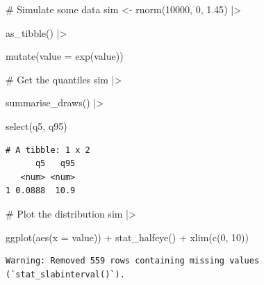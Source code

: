 \documentclass[
  letterpaper,
  DIV=11,
  numbers=noendperiod]{scrreprt}
\newenvironment{Shaded}{\begin{snugshade}}{\end{snugshade}}
\newcommand{\AttributeTok}[1]{\textcolor[rgb]{0.40,0.45,0.13}{#1}}
\newcommand{\CommentTok}[1]{\textcolor[rgb]{0.37,0.37,0.37}{#1}}
\newcommand{\DecValTok}[1]{\textcolor[rgb]{0.68,0.00,0.00}{#1}}
\newcommand{\FloatTok}[1]{\textcolor[rgb]{0.68,0.00,0.00}{#1}}
\newcommand{\FunctionTok}[1]{\textcolor[rgb]{0.28,0.35,0.67}{#1}}
\newcommand{\NormalTok}[1]{\textcolor[rgb]{0.00,0.23,0.31}{#1}}
\newcommand{\OtherTok}[1]{\textcolor[rgb]{0.00,0.23,0.31}{#1}}
\newcommand{\SpecialCharTok}[1]{\textcolor[rgb]{0.37,0.37,0.37}{#1}}
\begin{document}
\begin{Shaded}
\begin{Highlighting}[]
\CommentTok{\# Simulate some data}
\NormalTok{sim }\OtherTok{\textless{}{-}} \FunctionTok{rnorm}\NormalTok{(}\DecValTok{10000}\NormalTok{, }\DecValTok{0}\NormalTok{, }\FloatTok{1.45}\NormalTok{) }\SpecialCharTok{|\textgreater{}}

  \FunctionTok{as\_tibble}\NormalTok{() }\SpecialCharTok{|\textgreater{}}

  \FunctionTok{mutate}\NormalTok{(}\AttributeTok{value =} \FunctionTok{exp}\NormalTok{(value)) }

\CommentTok{\# Get the quantiles}
\NormalTok{sim }\SpecialCharTok{|\textgreater{}} 

  \FunctionTok{summarise\_draws}\NormalTok{() }\SpecialCharTok{|\textgreater{}}

  \FunctionTok{select}\NormalTok{(q5, q95)}
\end{Highlighting}
\end{Shaded}

\begin{verbatim}
# A tibble: 1 x 2
      q5   q95
   <num> <num>
1 0.0888  10.9
\end{verbatim}

\begin{Shaded}
\begin{Highlighting}[]
\CommentTok{\# Plot the distribution}
\NormalTok{sim }\SpecialCharTok{|\textgreater{}}

    \FunctionTok{ggplot}\NormalTok{(}\FunctionTok{aes}\NormalTok{(}\AttributeTok{x =}\NormalTok{ value)) }\SpecialCharTok{+}
    \FunctionTok{stat\_halfeye}\NormalTok{() }\SpecialCharTok{+}
    \FunctionTok{xlim}\NormalTok{(}\FunctionTok{c}\NormalTok{(}\DecValTok{0}\NormalTok{, }\DecValTok{10}\NormalTok{))}
\end{Highlighting}
\end{Shaded}

\begin{verbatim}
Warning: Removed 559 rows containing missing values (`stat_slabinterval()`).
\end{verbatim}
\end{document}
